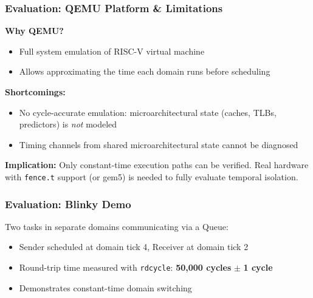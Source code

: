 \begin{frame}
\frametitle{Evaluation: QEMU Platform \& Limitations}

\textbf{Why QEMU?}
\begin{itemize}
  \item Full system emulation of RISC-V virtual machine
  \item Allows approximating the time each domain runs before scheduling
\end{itemize}

\vspace{0.3cm}
\textbf{Shortcomings:}
\begin{itemize}
  \item No cycle-accurate emulation: microarchitectural state (caches, TLBs, predictors) is \textit{not} modeled
  \item Timing channels from shared microarchitectural state cannot be diagnosed
\end{itemize}

\vspace{0.3cm}
\textbf{Implication:} Only constant-time execution paths can be verified. Real hardware with \texttt{fence.t} support (or gem5) is needed to fully evaluate temporal isolation.

\end{frame}

\begin{frame}
\frametitle{Evaluation: Blinky Demo}

Two tasks in separate domains communicating via a Queue:

\vspace{0.2cm}
\begin{center}
\resizebox{0.70\textwidth}{!}{}
\end{center}

\vspace{0.2cm}
\begin{itemize}
  \item Sender scheduled at domain tick 4, Receiver at domain tick 2
  \item Round-trip time measured with \texttt{rdcycle}: \textbf{50,000 cycles} $\pm$ \textbf{1 cycle}
  \item Demonstrates constant-time domain switching
\end{itemize}

\end{frame}

